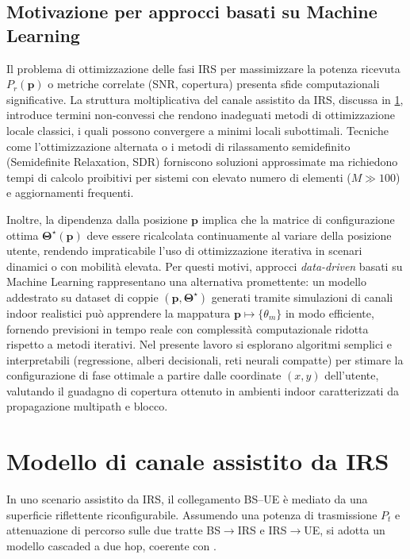 \documentclass[12pt,a4paper]{report}
\begin{document}
\subsection{Motivazione per approcci basati su Machine Learning}
Il problema di ottimizzazione delle fasi IRS per massimizzare la
potenza ricevuta $P_r(\mathbf{p})$ o metriche correlate (SNR,
copertura) presenta sfide computazionali significative. La struttura
moltiplicativa del canale assistito da IRS, discussa in
\cref{sec:canaleIRS}, introduce termini non-convessi che rendono
inadeguati metodi di ottimizzazione locale classici, i quali possono
convergere a minimi locali subottimali. Tecniche come
l'ottimizzazione alternata o i metodi di rilassamento semidefinito
(Semidefinite Relaxation, SDR) forniscono soluzioni approssimate ma
richiedono tempi di calcolo proibitivi per sistemi con elevato numero
di elementi ($M \gg 100$) e aggiornamenti frequenti.

Inoltre, la dipendenza dalla posizione $\mathbf{p}$ implica che la
matrice di configurazione ottima
$\boldsymbol{\Theta}^\star(\mathbf{p})$ deve essere ricalcolata
continuamente al variare della posizione utente, rendendo
impraticabile l'uso di ottimizzazione iterativa in scenari dinamici o
con mobilità elevata. Per questi motivi, approcci \emph{data-driven}
basati su Machine Learning rappresentano una alternativa promettente:
un modello addestrato su dataset di coppie $(\mathbf{p},
\boldsymbol{\Theta}^\star)$ generati tramite simulazioni di canali
indoor realistici può apprendere la mappatura $\mathbf{p} \mapsto
\{\theta_m\}$ in modo efficiente, fornendo previsioni in tempo reale
con complessità computazionale ridotta rispetto a metodi iterativi.
Nel presente lavoro si esplorano algoritmi semplici e interpretabili
(regressione, alberi decisionali, reti neurali compatte) per stimare
la configurazione di fase ottimale a partire dalle coordinate $(x,
y)$ dell'utente, valutando il guadagno di copertura ottenuto in
ambienti indoor caratterizzati da propagazione multipath e blocco.

\section{Modello di canale assistito da IRS}
\label{sec:canaleIRS}
In uno scenario assistito da IRS, il collegamento BS--UE è mediato da
una superficie riflettente riconfigurabile. Assumendo una potenza di
trasmissione $P_t$ e attenuazione di percorso sulle due tratte
BS$\to$IRS e IRS$\to$UE, si adotta un modello cascaded a due hop,
coerente con \cite{guo2021cascaded}.
\end{document}
